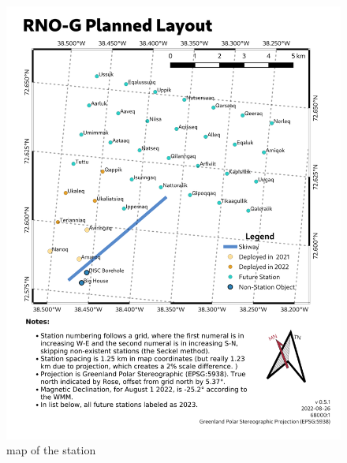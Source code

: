 \documentclass[11pt,a4paper,faculty=we,language=en,doctype=report]{cls/ugent-doc}
\begin{document}
\begin{figure}
	\includegraphics[width=\textwidth]{figures/station-map.png}	
	\caption{map of the station}
	\label{fig:station map}
\end{figure}

\newpage


\end{document}
